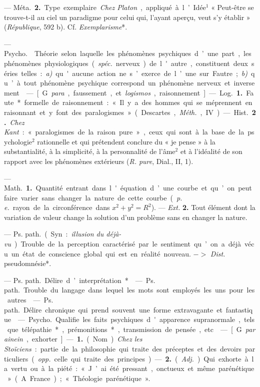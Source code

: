 \begin{itemize}[leftmargin=1cm, label=, itemsep=1pt]
— \si{Méta.} {\bf 2.} Type exemplaire. {\it Chez Platon}, appliqué à
l’Idée$^1$ « Peut-être se trouve-t-il au ciel un paradigme pour celui qui,
l'ayant aperçu, veut s'y établir » ({\it République}, 592 b). Cf. {\it
Exemplarisme}*.

 — \si{Psycho.}  Théorie selon laquelle les
phénomènes psychiques d’une part, les phénomènes physiologiques ({\it spéc.}
nerveux) de l'autre, constituent deux séries telles : {\it a)} qu'aucune
action ne s’exerce de l’une sur Fautre; {\it b)} qu’à tout phénomène
psychique correspond un phénomène nerveux et inversement.

 — [G. {\it para}, faussement, et {\it logismos},
raisonnement] — \si{Log.} {\bf 1.} Faute* formelle de raisonnement : « Il y a
des hommes qui se méprennent
en raisonnant et y font des paralogismes » (Descartes, {\it Méth.}, IV).—
\si{Hist.} {\bf 2.} {\it Chez Kant} : « paralogismes de la raison pure »,
ceux qui sont à la base de la psychologie$^2$ rationnelle et qui prétendent
conclure du « je pense » à la substantialité, à la simplicité, à la
personnalité de l’âme$^2$ et à l’idéalité de son rapport avec les phénomènes
extérieurs ({\it R. pure}, Dial., II, 1).

 — \si{Math.} {\bf 1.} Quantité entrant dans l'équation d’une
courbe et qu’on peut faire varier sans changer la nature de cette courbe
({\it p. e.} rayon de la circonférence dans $x^2+ y^2=R^2$). — {\it Ext.}
{\bf 2.} Tout élément dont la variation de valeur change la solution d’un
problème sans en changer la nature.

 — \si{Ps. path.} (Syn. : {\it illusion du déjà-vu}). Trouble
de la perception caractérisé par le sentiment qu’on a déjà vécu un état de
conscience global qui est en réalité nouveau. $->$ {\it Dist.} pseudomnésie*.

 — \si{Ps. path.} Délire d’interprétation*.

 — \si{Ps. path.} Trouble du langage dans lequel les mots sont
employés les uns pour les autres.

 — \si{Ps. path.} Délire chronique qui prend souvent une
forme extravagante et fantastique.

 — \si{Psycho.} Qualifie les faits psychiques d'apparence
supranormale, tels que télépathie*, prémonitions*, transmission de pensée,
etc.

 — [G. {\it parainein}, exhorter] — {\bf 1.} (Nom) {\it Chez
les Stoïciens} : partie de la philosophie qui traite des préceptes et des
devoirs particuliers ({\it opp.} celle qui traite des principes).
— {\bf 2.} ({\it Adj.}). Qui exhorte à la vertu ou à la piété : « J’ai été
pressant, onctueux et même parénétique » (A. France) ; « Théologie
parénétique ».


\end{itemize}
